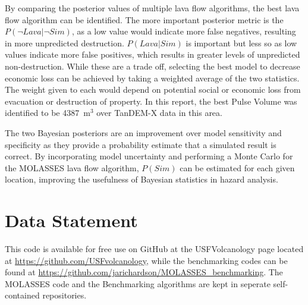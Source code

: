 \documentclass[12pt,letter]{article}
\begin{document}
			By comparing the posterior values of multiple lava flow algorithms, the best lava flow algorithm can be identified. The more important posterior metric is the $P(\neg Lava|\neg Sim)$, as a low value would indicate more false negatives, resulting in more unpredicted destruction. $P(Lava|Sim)$ is important but less so as low values indicate more false positives, which results in greater levels of unpredicted non-destruction. While these are a trade off, selecting the best model to decrease economic loss can be achieved by taking a weighted average of the two statistics. The weight given to each would depend on potential social or economic loss from evacuation or destruction of property. In this report, the best Pulse Volume was identified to be 4387~m$^3$ over TanDEM-X data in this area.

The two Bayesian posteriors are an improvement over model sensitivity and specificity as they provide a probability estimate that a simulated result is correct. By incorporating model uncertainty and performing a Monte Carlo for the MOLASSES lava flow algorithm, $P(Sim)$ can be estimated for each given location, improving the usefulness of Bayesian statistics in hazard analysis.
	
\section{Data Statement}
This code is available for free use on GitHub at the USFVolcanology page located at \url{https://github.com/USFvolcanology}, while the benchmarking codes can be found at \url{https://github.com/jarichardson/MOLASSES_benchmarking}. The MOLASSES code and the Benchmarking algorithms are kept in seperate self-contained repositories.





\end{document}
